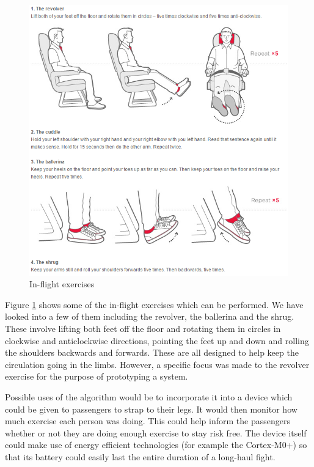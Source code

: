 \begin{figure}[h]
  \centering
    \includegraphics[width=1.0\textwidth]{figures/exercises}
  \caption{In-flight exercises \cite{virgin2015exercises}}
  \label{fig:exercises}
\end{figure}

Figure \ref{fig:exercises} shows some of the in-flight exercises which can be performed. We have looked into a few of them including the revolver, the ballerina and the shrug. These involve lifting both feet off the floor and rotating them in circles in clockwise and anticlockwise directions, pointing the feet up and down and rolling the shoulders backwards and forwards. These are all designed to help keep the circulation going in the limbs. However, a specific focus was made to the revolver exercise for the purpose of prototyping a system.

Possible uses of the algorithm would be to incorporate it into a device which could be given to passengers to strap to their legs. It would then monitor how much exercise each person was doing. This could help inform the passengers whether or not they are doing enough exercise to stay risk free. The device itself could make use of energy efficient technologies (for example the Cortex-M0+) so that its battery could easily last the entire duration of a long-haul fight.

